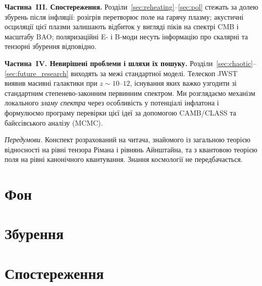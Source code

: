 \documentclass[12pt, a4paper, openany]{book}
\begin{document}
\textbf{Частина~III. Спостереження.} Розділи~\ref{sec:reheating}–\ref{sec:pol}
стежать за долею збурень після інфляції: розігрів перетворює поле на
гарячу плазму; акустичні осциляції цієї плазми залишають відбиток у
вигляді піків на спектрі CMB і масштабу BAO; поляризаційні E- і B-моди
несуть інформацію про скалярні та тензорні збурення відповідно.

\textbf{Частина~IV. Невирішені проблеми і шляхи їх пошуку.} Розділи~\ref{sec:chaotic}–\ref{sec:future_research}
виходять за межі стандартної моделі. Телескоп JWST виявив масивні
галактики при $z \sim 10$–$12$, існування яких важко узгодити зі
стандартним степенево-законним первинним спектром. Ми розглядаємо
механізм локального \emph{зламу спектра} через особливість у потенціалі
інфлатона і формулюємо програму перевірки цієї ідеї за допомогою
CAMB/CLASS та байєсівського аналізу (MCMC).

\bigskip
\noindent
\textit{Передумови.} Конспект розрахований на читача, знайомого із
загальною теорією відносності на рівні тензора Рімана і рівнянь
Айнштайна, та з квантовою теорією поля на рівні канонічного
квантування. Знання космології не передбачається.

\newpage

\part{Фон}



\part{Збурення}



\part{Спостереження}





\end{document}

